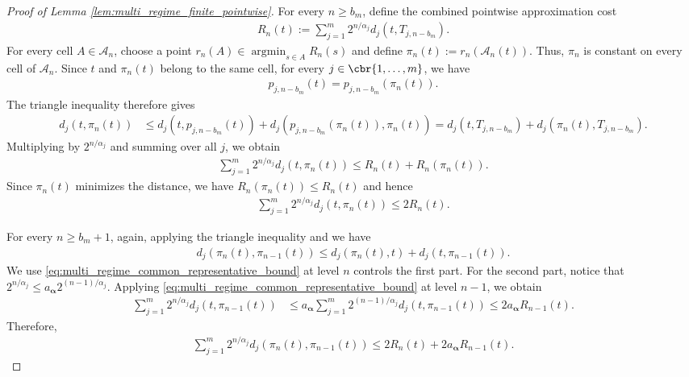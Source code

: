 \documentclass[11pt]{article}
\begin{document}
\begin{proof}[Proof of Lemma \ref{lem:multi_regime_finite_pointwise}]
For every $n\ge b_m$, define the combined pointwise approximation cost
\begin{align*}
R_n(t)
:=
\sum_{j=1}^m
2^{n/\alpha_j}d_j(t,T_{j,n-b_m}).
\end{align*}
For every cell $A\in\mathcal A_n$, choose a point
$r_n(A)
\in
\operatorname*{argmin}_{s\in A}R_n(s)$ and define $\pi_n(t)
:=
r_n(\mathcal A_n(t))$.
Thus, $\pi_n$ is constant on every cell of $\mathcal A_n$.
Since $t$ and $\pi_n(t)$ belong to the same cell, for every
$j\in\cbr{1,\ldots,m}$, we have
\begin{align*}
p_{j,n-b_m}(t)
=
p_{j,n-b_m}(\pi_n(t)).
\end{align*}
The triangle inequality therefore gives
\begin{align*}
d_j(t,\pi_n(t))
&\le
d_j(t,p_{j,n-b_m}(t))
+
d_j(p_{j,n-b_m}(\pi_n(t)),\pi_n(t))=
d_j(t,T_{j,n-b_m})
+
d_j(\pi_n(t),T_{j,n-b_m}).
\end{align*}
Multiplying by $2^{n/\alpha_j}$ and summing over all $j$, we obtain
\begin{align*}
\sum_{j=1}^m
2^{n/\alpha_j}d_j(t,\pi_n(t))
\le
R_n(t)+R_n(\pi_n(t)).
\end{align*}
Since $\pi_n(t)$ minimizes the distance, we have $R_n(\pi_n(t))
\le
R_n(t)$ and hence
\begin{align}
\sum_{j=1}^m
2^{n/\alpha_j}d_j(t,\pi_n(t))
\le
2R_n(t).
\label{eq:multi_regime_common_representative_bound}
\end{align}

For every $n\ge b_m+1$, again, applying the triangle inequality and we have
\begin{align*}
d_j(\pi_n(t),\pi_{n-1}(t))
\le
d_j(\pi_n(t),t)
+
d_j(t,\pi_{n-1}(t)).
\end{align*}
We use \eqref{eq:multi_regime_common_representative_bound} at level
$n$ controls the first part. For the second part, notice that
$2^{n/\alpha_j}
\le
a_{\boldsymbol\alpha}2^{(n-1)/\alpha_j}$. Applying \eqref{eq:multi_regime_common_representative_bound} at level
$n-1$, we obtain
\begin{align*}
\sum_{j=1}^m
2^{n/\alpha_j}d_j(t,\pi_{n-1}(t))
&\le
a_{\boldsymbol\alpha}
\sum_{j=1}^m
2^{(n-1)/\alpha_j}d_j(t,\pi_{n-1}(t))\le
2a_{\boldsymbol\alpha}R_{n-1}(t).
\end{align*}
Therefore,
\begin{align}
\sum_{j=1}^m
2^{n/\alpha_j}
d_j(\pi_n(t),\pi_{n-1}(t))
\le
2R_n(t)
+
2a_{\boldsymbol\alpha}R_{n-1}(t).
\label{eq:multi_regime_common_parent_edge_bound}
\end{align}


\end{proof}
\end{document}
